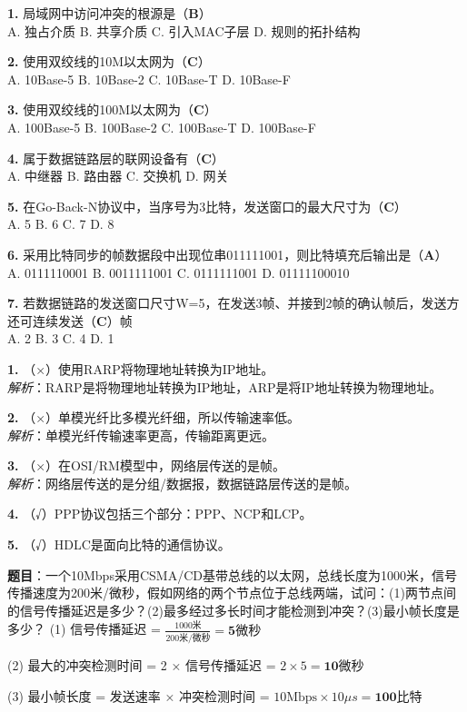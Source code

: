\begin{examplebox}[选择题]
\textbf{1.} 局域网中访问冲突的根源是（\textbf{B}）\\
A. 独占介质 \quad B. 共享介质 \quad C. 引入MAC子层 \quad D. 规则的拓扑结构

\textbf{2.} 使用双绞线的10M以太网为（\textbf{C}）\\
A. 10Base-5 \quad B. 10Base-2 \quad C. 10Base-T \quad D. 10Base-F

\textbf{3.} 使用双绞线的100M以太网为（\textbf{C}）\\
A. 100Base-5 \quad B. 100Base-2 \quad C. 100Base-T \quad D. 100Base-F

\textbf{4.} 属于数据链路层的联网设备有（\textbf{C}）\\
A. 中继器 \quad B. 路由器 \quad C. 交换机 \quad D. 网关

\textbf{5.} 在Go-Back-N协议中，当序号为3比特，发送窗口的最大尺寸为（\textbf{C}）\\
A. 5 \quad B. 6 \quad C. 7 \quad D. 8

\textbf{6.} 采用比特同步的帧数据段中出现位串011111001，则比特填充后输出是（\textbf{A}）\\
A. 0111110001 \quad B. 0011111001 \quad C. 0111111001 \quad D. 01111100010

\textbf{7.} 若数据链路的发送窗口尺寸W=5，在发送3帧、并接到2帧的确认帧后，发送方还可连续发送（\textbf{C}）帧\\
A. 2 \quad B. 3 \quad C. 4 \quad D. 1
\end{examplebox}

\begin{examplebox}[判断题]
\textbf{1.} （×）使用RARP将物理地址转换为IP地址。\\
\textit{解析}：RARP是将物理地址转换为IP地址，ARP是将IP地址转换为物理地址。

\textbf{2.} （×）单模光纤比多模光纤细，所以传输速率低。\\
\textit{解析}：单模光纤传输速率更高，传输距离更远。

\textbf{3.} （×）在OSI/RM模型中，网络层传送的是帧。\\
\textit{解析}：网络层传送的是分组/数据报，数据链路层传送的是帧。

\textbf{4.} （√）PPP协议包括三个部分：PPP、NCP和LCP。

\textbf{5.} （√）HDLC是面向比特的通信协议。
\end{examplebox}

\begin{examplebox}
\textbf{题目}：一个10Mbps采用CSMA/CD基带总线的以太网，总线长度为1000米，信号传播速度为200米/微秒，假如网络的两个节点位于总线两端，试问：(1)两节点间的信号传播延迟是多少？(2)最多经过多长时间才能检测到冲突？(3)最小帧长度是多少？
\tcblower
(1) 信号传播延迟 = $\frac{1000\text{米}}{200\text{米/微秒}} = \textbf{5微秒}$

(2) 最大的冲突检测时间 = 2 × 信号传播延迟 = $2 \times 5 = \textbf{10微秒}$

(3) 最小帧长度 = 发送速率 × 冲突检测时间 = $10\text{Mbps} \times 10\mu s = \textbf{100比特}$
\end{examplebox}

